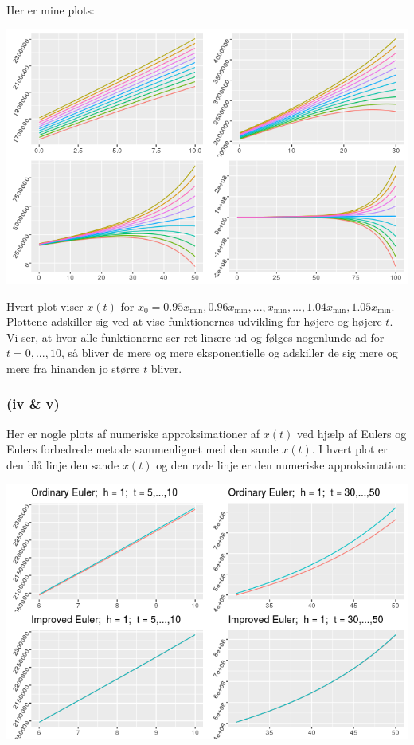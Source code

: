 \documentclass[12pt]{article}
\begin{document}
Her er mine plots:
\begin{center}
\includegraphics[scale=0.5]{q3p1.png}
\end{center}
Hvert plot viser $x(t)$ for $x_0=0.95x_{\min}, 0.96x_{\min}, ..., x_{\min}, ..., 1.04x_{\min}, 1.05x_{\min}$. Plottene adskiller sig ved at vise funktionernes udvikling for højere og højere $t$. Vi ser, at hvor alle funktionerne ser ret linære ud og følges nogenlunde ad for $t=0,...,10$, så bliver de mere og mere eksponentielle og adskiller de sig mere og mere fra hinanden jo større $t$ bliver.

\subsubsection{(iv \& v)}

Her er nogle plots af numeriske approksimationer af $x(t)$ ved hjælp af Eulers og Eulers forbedrede metode sammenlignet med den sande $x(t)$. I hvert plot er den blå linje den sande $x(t)$ og den røde linje er den numeriske approksimation:

\begin{center}
\includegraphics[scale=0.5]{q3p2.png}
\end{center}
\end{document}
